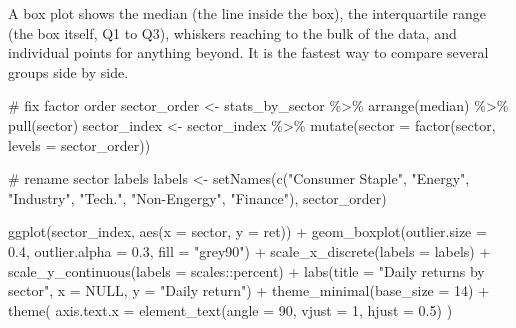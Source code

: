 \documentclass[
  12pt,
  a4paper,
]{scrbook}
\newenvironment{Shaded}{\begin{snugshade}}{\end{snugshade}}
\newcommand{\AttributeTok}[1]{\textcolor[rgb]{0.40,0.45,0.13}{#1}}
\newcommand{\CommentTok}[1]{\textcolor[rgb]{0.37,0.37,0.37}{#1}}
\newcommand{\ConstantTok}[1]{\textcolor[rgb]{0.56,0.35,0.01}{#1}}
\newcommand{\DecValTok}[1]{\textcolor[rgb]{0.68,0.00,0.00}{#1}}
\newcommand{\FloatTok}[1]{\textcolor[rgb]{0.68,0.00,0.00}{#1}}
\newcommand{\FunctionTok}[1]{\textcolor[rgb]{0.28,0.35,0.67}{#1}}
\newcommand{\NormalTok}[1]{\textcolor[rgb]{0.00,0.23,0.31}{#1}}
\newcommand{\OtherTok}[1]{\textcolor[rgb]{0.00,0.23,0.31}{#1}}
\newcommand{\SpecialCharTok}[1]{\textcolor[rgb]{0.37,0.37,0.37}{#1}}
\newcommand{\StringTok}[1]{\textcolor[rgb]{0.13,0.47,0.30}{#1}}
\theoremstyle{plain}
\theoremstyle{definition}
\theoremstyle{remark}
\begin{document}
A box plot shows the median (the line inside the box), the interquartile
range (the box itself, Q1 to Q3), whiskers reaching to the bulk of the
data, and individual points for anything beyond. It is the fastest way
to compare several groups side by side.

\begin{Shaded}
\begin{Highlighting}[]
\CommentTok{\# fix factor order}
\NormalTok{sector\_order }\OtherTok{\textless{}{-}}\NormalTok{ stats\_by\_sector }\SpecialCharTok{\%\textgreater{}\%}
    \FunctionTok{arrange}\NormalTok{(median) }\SpecialCharTok{\%\textgreater{}\%}
    \FunctionTok{pull}\NormalTok{(sector)}
\NormalTok{sector\_index }\OtherTok{\textless{}{-}}\NormalTok{ sector\_index }\SpecialCharTok{\%\textgreater{}\%}
    \FunctionTok{mutate}\NormalTok{(}\AttributeTok{sector =} \FunctionTok{factor}\NormalTok{(sector, }\AttributeTok{levels =}\NormalTok{ sector\_order))}

\CommentTok{\# rename sector labels}
\NormalTok{labels }\OtherTok{\textless{}{-}} \FunctionTok{setNames}\NormalTok{(}\FunctionTok{c}\NormalTok{(}\StringTok{"Consumer Staple"}\NormalTok{, }\StringTok{"Energy"}\NormalTok{, }\StringTok{"Industry"}\NormalTok{, }\StringTok{"Tech."}\NormalTok{, }\StringTok{"Non{-}Engergy"}\NormalTok{, }\StringTok{"Finance"}\NormalTok{), sector\_order)}

\FunctionTok{ggplot}\NormalTok{(sector\_index, }\FunctionTok{aes}\NormalTok{(}\AttributeTok{x =}\NormalTok{ sector, }\AttributeTok{y =}\NormalTok{ ret)) }\SpecialCharTok{+}
    \FunctionTok{geom\_boxplot}\NormalTok{(}\AttributeTok{outlier.size =} \FloatTok{0.4}\NormalTok{, }\AttributeTok{outlier.alpha =} \FloatTok{0.3}\NormalTok{, }\AttributeTok{fill =} \StringTok{"grey90"}\NormalTok{) }\SpecialCharTok{+}
    \FunctionTok{scale\_x\_discrete}\NormalTok{(}\AttributeTok{labels =}\NormalTok{ labels) }\SpecialCharTok{+}
    \FunctionTok{scale\_y\_continuous}\NormalTok{(}\AttributeTok{labels =}\NormalTok{ scales}\SpecialCharTok{::}\NormalTok{percent) }\SpecialCharTok{+}
    \FunctionTok{labs}\NormalTok{(}\AttributeTok{title =} \StringTok{"Daily returns by sector"}\NormalTok{, }\AttributeTok{x =} \ConstantTok{NULL}\NormalTok{, }\AttributeTok{y =} \StringTok{"Daily return"}\NormalTok{) }\SpecialCharTok{+}
    \FunctionTok{theme\_minimal}\NormalTok{(}\AttributeTok{base\_size =} \DecValTok{14}\NormalTok{) }\SpecialCharTok{+}
    \FunctionTok{theme}\NormalTok{(}
        \AttributeTok{axis.text.x =} \FunctionTok{element\_text}\NormalTok{(}\AttributeTok{angle =} \DecValTok{90}\NormalTok{, }\AttributeTok{vjust =} \DecValTok{1}\NormalTok{, }\AttributeTok{hjust =} \FloatTok{0.5}\NormalTok{)}
\NormalTok{    )}
\end{Highlighting}
\end{Shaded}
\end{document}
